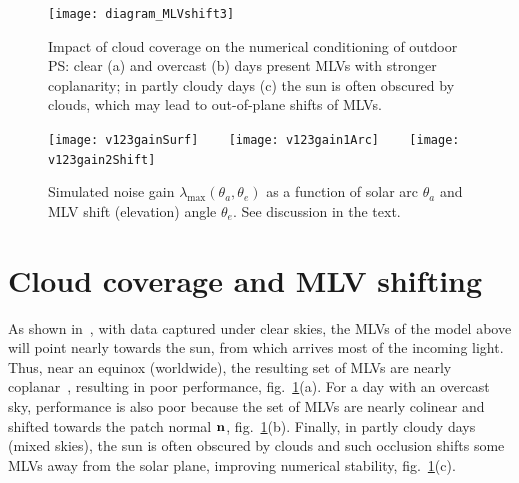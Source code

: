 
\begin{figure}[t]
\centering
\texttt{[image: diagram\_MLVshift3]}
\caption[Impact of cloud coverage on PS conditioning]{Impact of cloud coverage on the numerical conditioning of outdoor PS: clear (a) and overcast (b) days present MLVs with stronger coplanarity; in partly cloudy days (c) the sun is often obscured by clouds, which may lead to out-of-plane shifts of MLVs.}
\label{fig:MLVshift}
\end{figure}
\begin{figure}[t]
\centering
\texttt{[image: v123gainSurf]} \ \ \ %
\texttt{[image: v123gain1Arc]} \ \ \ %
\texttt{[image: v123gain2Shift]}
\caption[Simulated noise gain as function of solar arc and mean light vector shift]{Simulated noise gain $\lambda_{\max}(\theta_a,\theta_e)$ as a function of solar arc $\theta_a$ and MLV shift (elevation) angle $\theta_e$. See discussion in the text.}
\label{fig:v123gain}
\end{figure}

\section{Cloud coverage and MLV shifting}
\label{subsec:mlv-clouds}

As shown in~\cite{holdgeoffroy-iccp-15}, with data captured under clear skies, the MLVs of the model above will point nearly towards the sun, from which arrives most of the incoming light. Thus, near an equinox (worldwide), the resulting set of MLVs are nearly coplanar~\cite{shen-pg-14}, resulting in poor performance, fig.~\ref{fig:MLVshift}(a). For a day with an overcast sky, performance is also poor because the set of MLVs are nearly colinear and shifted towards the patch normal ${\bf n}$, fig.~\ref{fig:MLVshift}(b). Finally, in partly cloudy days (mixed skies), the sun is often obscured by clouds and such occlusion shifts some MLVs away from the solar plane, improving numerical stability, fig.~\ref{fig:MLVshift}(c). 

